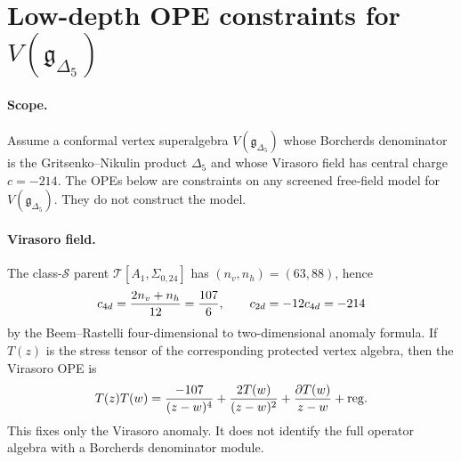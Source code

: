 \section{Low-depth OPE constraints for $V(\mathfrak{g}_{\Delta_5})$}
\label{wn:sec:delta5-vacuum-OPE-depth-5}

\providecommand{\gDelta}{\mathfrak{g}_{\Delta_5}}
\providecommand{\VDelta}{V(\gDelta)}
\providecommand{\VLatt}{V_{\Lambda^{2,1}}}
\providecommand{\NO}[1]{\mathopen{:}{#1}\mathclose{:}}
\providecommand{\kBKM}{\kappa_{\mathrm{BKM}}}
\providecommand{\kch}{\kappa_{\mathrm{ch}}}
\providecommand{\kcat}{\kappa_{\mathrm{cat}}}
\providecommand{\kfib}{\kappa_{\mathrm{fiber}}}

\paragraph{Scope.}
Assume a conformal vertex superalgebra $\VDelta$ whose Borcherds
denominator is the Gritsenko--Nikulin product $\Delta_5$ and whose
Virasoro field has central charge $c=-214$. The OPEs below are
constraints on any screened free-field model for $\VDelta$. They do not
construct the model.

\paragraph{Virasoro field.}
The class-$\mathcal S$ parent
$\mathcal T[A_1,\Sigma_{0,24}]$ has
$(n_v,n_h)=(63,88)$, hence
\[
  c_{4d}={2n_v+n_h\over 12}={107\over 6},
  \qquad
  c_{2d}=-12c_{4d}=-214
\]
by the Beem--Rastelli four-dimensional to two-dimensional anomaly
formula. If $T(z)$ is the stress tensor of the corresponding protected
vertex algebra, then the Virasoro OPE is
\begin{equation}
\label{wn:eq:delta5-TT-ope}
T(z)T(w)
 =
 { -107\over (z-w)^4}
 + {2T(w)\over (z-w)^2}
 + {\partial T(w)\over z-w}
 + \mathrm{reg}.
\end{equation}
This fixes only the Virasoro anomaly. It does not identify the full
operator algebra with a Borcherds denominator module.

